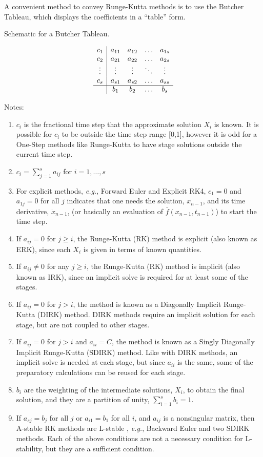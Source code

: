 A convenient method to convey Runge-Kutta methods is to use the Butcher
Tableau, which displays the coefficients in a ``table'' form.
\begin{table}[H]
\caption{Schematic for a Butcher Tableau.\label{rythmos:tab:SchematicButcherTableau}}
\[
\begin{array}{c|cccc}
c_{1} & a_{11} & a_{12} & \ldots & a_{1s}\\
c_{2} & a_{21} & a_{22} & \ldots & a_{2s}\\
\vdots & \vdots & \vdots & \ddots & \vdots\\
c_{s} & a_{s1} & a_{s2} & \ldots & a_{ss}\\
\hline  & b_{1} & b_{2} & \ldots & b_{s}
\end{array}
\]
\end{table}
Notes:
\begin{enumerate}
\item $c_{i}$ is the fractional time step that the approximate solution
$X_{i}$ is known. It is possible for $c_{i}$ to be outside the time
step range {[}0,1{]}, however it is odd for a One-Step methods like
Runge-Kutta to have stage solutions outside the current time step. 
\item $c_{i}=\sum_{j=1}^{s}a_{ij}$ for $i=1,\ldots,s$
\item For explicit methods, \emph{e.g.}, Forward Euler and Explicit RK4,
$c_{1}=0$ and $a_{1j}=0$ for all $j$ indicates that one needs the
solution, $x_{n-1}$, and its time derivative, $\dot{x}_{n-1}$, (or
basically an evaluation of $\bar{f}(x_{n-1},t_{n-1})$) to start the
time step.
\item If $a_{ij}=0$ for $j\ge i$, the Runge-Kutta (RK) method is explicit
(also known as ERK), since each $X_{i}$ is given in terms of known
quantities.
\item If $a_{ij}\ne0$ for any $j\ge i$, the Runge-Kutta (RK) method is
implicit (also known as IRK), since an implicit solve is required
for at least some of the stages.
\item If $a_{ij}=0$ for $j>i$, the method is known as a Diagonally Implicit
Runge-Kutta (DIRK) method. DIRK methods require an implicit solution
for each stage, but are not coupled to other stages.
\item If $a_{ij}=0$ for $j>i$ and $a_{ii}=C$, the method is known as
a Singly Diagonally Implicit Runge-Kutta (SDIRK) method. Like with
DIRK methods, an implicit solve is needed at each stage, but since
$a_{ii}$ is the same, some of the preparatory calculations can be
reused for each stage.
\item $b_{i}$ are the weighting of the intermediate solutions, $X_{i}$,
to obtain the final solution, and they are a partition of unity, $\sum_{i=1}^{s}b_{i}=1$.
\item If $a_{sj}=b_{j}$ for all $j$ or $a_{i1}=b_{1}$ for all $i$, and
$a_{ij}$ is a nonsingular matrix, then A-stable RK methods are L-stable
\cite[p. 45]{HairerWanner}\cite[p. 103]{AscherPetzold}, \emph{e.g.},
Backward Euler and two SDIRK methods. Each of the above conditions
are not a necessary condition for L-stability, but they are a sufficient
condition.
\end{enumerate}

